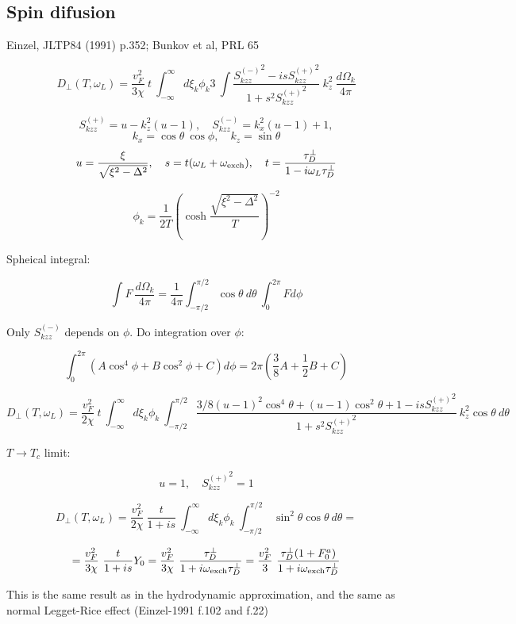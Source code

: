 \documentclass[a4paper]{article}
\begin{document}
\subsection*{Spin difusion}

\def\tdp{\tau_D^\perp}
\def\ol{\omega_L}
\def\oe{\omega_{\rm exch}}
\def\sm{S_{kzz}^{(-)}}
\def\sp{S_{kzz}^{(+)}}

Einzel, JLTP84 (1991) p.352; Bunkov et al, PRL 65

$$
D_\perp (T, \ol) =
  \frac{v_F^2}{3\chi}\ t
  \ \int_{-\infty}^{\infty}
  d\xi_k\phi_k 3
  \ \int \frac{{\sm}^2 - is{\sp}^2}{1+s^2{\sp}^2}
  \  k_z^2\ \frac{d\Omega_k}{4\pi}
$$

$$
\sp = u - k_z^2(u-1),\quad
\sm = k_x^2(u-1) + 1,
$$
$$
k_x = \cos\theta\ \cos\phi, \quad
k_z = \sin\theta
$$
$$
u=\frac{\xi}{\sqrt{\xi^2-\Delta^2}}, \quad
s = t(\ol+\oe),\quad
t = \frac{\tdp}{1-i\ol\tdp}
$$

$$
\phi_k = \frac{1}{2T}\left(\cosh\frac{\sqrt{\xi^2-\Delta^2}}{T}\right)^{-2}
$$

Spheical integral:

$$
\int F\ \frac{d\Omega_k}{4\pi} =
  \frac1{4\pi}\int_{-\pi/2}^{\pi/2} \cos\theta\ d\theta
  \ \int_0^{2\pi} F d\phi
$$

Only $\sm$ depends on $\phi$. Do integration over $\phi$:

$$
\int_0^{2\pi} (A\cos^4\phi + B\cos^2\phi + C) d\phi =
2\pi(\frac38 A + \frac12 B + C)
$$


$$
D_\perp (T, \ol) =
  \frac{v_F^2}{2\chi}\ t
  \ \int_{-\infty}^{\infty}
  d\xi_k\phi_k
  \ \int_{-\pi/2}^{\pi/2}
   \frac{3/8(u-1)^2\cos^4\theta + (u-1)\cos^2\theta + 1 - is{\sp}^2}{1+s^2{\sp}^2}
  \  k_z^2 \cos\theta \ d\theta
$$

$T\rightarrow T_c$ limit:

$$
u=1,\quad
{\sp}^2 = 1
$$

$$
D_\perp (T, \ol) =
  \frac{v_F^2}{2\chi}
  \ \frac{t}{1+is}
  \ \int_{-\infty}^{\infty}
  d\xi_k\phi_k
  \ \int_{-\pi/2}^{\pi/2}
  \  \sin^2\theta \cos\theta \ d\theta =
$$

$$
  = \frac{v_F^2}{3\chi} \ \frac{t}{1+is} Y_0
  = \frac{v_F^2}{3\chi} \ \frac{\tdp}{1+i\oe\tdp}
  = \frac{v_F^2}{3}\ \frac{\tdp (1+F_0^a)}{1+i\oe\tdp}
$$

This is the same result as in the hydrodynamic approximation,
and the same as normal Legget-Rice effect (Einzel-1991 f.102 and f.22)
\end{document}
